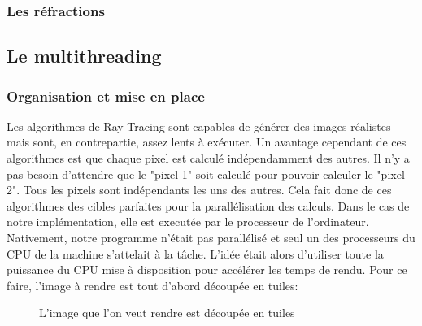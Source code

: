 \documentclass[11pt]{article}
\begin{document}
\subsubsection{Les réfractions}

\subsection{Le multithreading}
\subsubsection{Organisation et mise en place}

Les algorithmes de Ray Tracing sont capables de générer des images réalistes mais sont, en contrepartie, assez lents à exécuter. Un avantage cependant de ces algorithmes est que chaque pixel est calculé indépendamment des autres. Il n'y a pas besoin d'attendre que le "pixel 1" soit calculé pour pouvoir calculer le "pixel 2". Tous les pixels sont indépendants les uns des autres. Cela fait donc de ces algorithmes des cibles parfaites pour la parallélisation des calculs. Dans le cas de notre implémentation, elle est executée par le processeur de l'ordinateur. Nativement, notre programme n'était pas parallélisé et seul un des processeurs du CPU de la machine s'attelait à la tâche. L'idée était alors d'utiliser toute la puissance du CPU mise à disposition pour accélérer les temps de rendu. Pour ce faire, l'image à rendre est tout d'abord découpée en tuiles:

\begin{figure}[h!]

	\caption{L'image que l'on veut rendre est découpée en tuiles}
	\label{grilleMultithreading}
\end{figure}
\FloatBarrier
\end{document}
